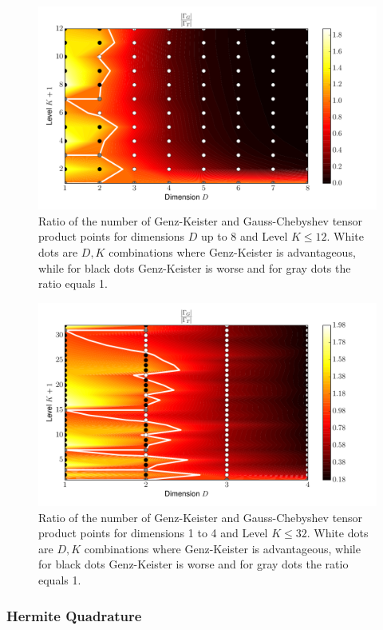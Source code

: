 \documentclass[a4paper,10pt]{article}
\begin{document}
\begin{figure}[h]
  \centering
  \includegraphics[width=0.8\linewidth]{./img/gk_chebyshevu_ratio.pdf}
  \caption{Ratio of the number of Genz-Keister and Gauss-Chebyshev tensor product
  points for dimensions $D$ up to 8 and Level $K \leq 12$. White dots are $D,K$
  combinations where Genz-Keister is advantageous, while for black dots
  Genz-Keister is worse and for gray dots the ratio equals 1.}
  \label{fig:gk_chebyshevu_ratio}
\end{figure}

\begin{figure}[h]
  \centering
  \includegraphics[width=0.8\linewidth]{./img/gk_chebyshevu_ratio_large.pdf}
  \caption{Ratio of the number of Genz-Keister and Gauss-Chebyshev tensor product
  points for dimensions 1 to 4 and Level $K \leq 32$. White dots are $D,K$
  combinations where Genz-Keister is advantageous, while for black dots
  Genz-Keister is worse and for gray dots the ratio equals 1.}
  \label{fig:gk_chebyshevu_ratio_large}
\end{figure}

\FloatBarrier
\subsubsection{Hermite Quadrature}
\end{document}

